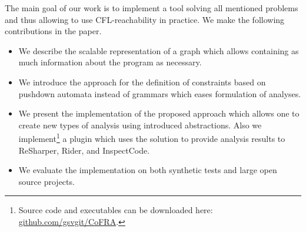 The main goal of our work is to implement a tool solving all mentioned problems and thus allowing to use CFL-reachability in practice.
We make the following contributions in the paper.
\begin{itemize}
	\item We describe the scalable representation of a graph which allows containing as much information about the program as necessary.
	\item We introduce the approach for the definition of constraints based on pushdown automata instead of grammars which eases formulation of analyses.
	\item We present the implementation of the proposed approach which allows one to create new types of analysis using introduced abstractions.
	Also we implement\footnote{Source code and executables can be downloaded here: \url{github.com/gsvgit/CoFRA}.} a plugin which uses the solution to provide analysis results to ReSharper, Rider, and InspectCode.
	\item We evaluate the implementation on both synthetic tests and large open source projects.
\end{itemize}

